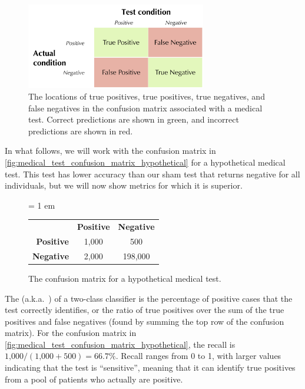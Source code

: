\begin{figure}[h]
\centering
\mySfFamily
\includegraphics[width = 0.7\textwidth]{../images/medical_test_confusion_matrix.png}
\caption{The locations of true positives, true positives, true negatives, and false negatives in the confusion matrix associated with a medical test. Correct predictions are shown in green, and incorrect predictions are shown in red.}
\label{fig:medical_test_confusion_matrix}
\end{figure}

In what follows, we will work with the confusion matrix in \autoref{fig:medical_test_confusion_matrix_hypothetical} for a hypothetical medical test. This test has lower accuracy than our sham test that returns negative for all individuals, but we will now show metrics for which it is superior.\\

\begin{figure}[h]
\centering
\tabcolsep = 1 em
\mySfFamily
{}
\begin{tabular}{r c c}
\rowcolor{gray!50}
& \textbf{Positive} & \textbf{Negative} \\
 \textbf{Positive} & 1,000 & \phantom{198,}500 \\
\textbf{Negative} & 2,000 & 198,000 \\
\end{tabular}
\caption{The confusion matrix for a hypothetical medical test.}
\label{fig:medical_test_confusion_matrix_hypothetical}
\end{figure}


The  (a.k.a.~) of a two-class classifier is the percentage of positive cases that the test correctly identifies, or the ratio of true positives over the sum of the true positives and false negatives (found by summing the top row of the confusion matrix). For the confusion matrix in \autoref{fig:medical_test_confusion_matrix_hypothetical}, the recall is $\text{1,000}/(\text{1,000} + 500) = 66.7\%$. Recall ranges from 0 to 1, with larger values indicating that the test is ``sensitive'', meaning that it can identify true positives from a pool of patients who actually are positive.


